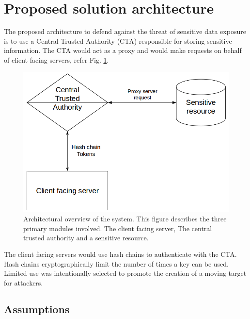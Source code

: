 \documentclass{sig-alternate-05-2015}
\begin{document}
\section*{Proposed solution architecture}

The proposed architecture to defend against the threat of sensitive data exposure is to use a Central Trusted Authority (CTA) responsible for storing sensitive information. The CTA would act as a proxy and would make requests on behalf of client facing servers, refer Fig. \ref{fig:architectureoverview}.

\begin{figure}[hbtp]
\includegraphics[scale=0.3]{overview_architecture.png}
\caption{Architectural overview of the system. This figure describes the three primary modules involved. The client facing server, The central trusted authority and a sensitive resource.}
\label{fig:architectureoverview} 
\end{figure}

The client facing servers would use hash chains to authenticate with the CTA. Hash chains cryptographically limit the number of times a key can be used. Limited use was intentionally selected to promote the creation of a moving target for attackers.

\subsection*{Assumptions}
\end{document}
